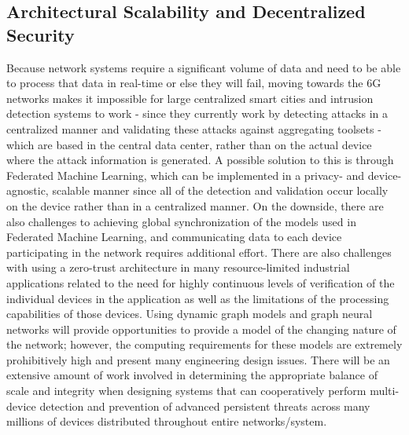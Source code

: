 \documentclass[12pt]{article}
\begin{document}
\subsection{Architectural Scalability and Decentralized Security}
Because network systems require a significant volume of data and need to be able to process that data in real-time or else they will fail, moving towards the 6G networks makes it impossible for large centralized smart cities and intrusion detection systems to work - since they currently work by detecting attacks in a centralized manner and validating these attacks against aggregating toolsets - which are based in the central data center, rather than on the actual device where the attack information is generated. A possible solution to this is through Federated Machine Learning, which can be implemented in a privacy- and device-agnostic, scalable manner since all of the detection and validation occur locally on the device rather than in a centralized manner. On the downside, there are also challenges to achieving global synchronization of the models used in Federated Machine Learning, and communicating data to each device participating in the network requires additional effort. There are also challenges with using a zero-trust architecture in many resource-limited industrial applications related to the need for highly continuous levels of verification of the individual devices in the application as well as the limitations of the processing capabilities of those devices. Using dynamic graph models and graph neural networks will provide opportunities to provide a model of the changing nature of the network; however, the computing requirements for these models are extremely prohibitively high and present many engineering design issues. There will be an extensive amount of work involved in determining the appropriate balance of scale and integrity when designing systems that can cooperatively perform multi-device detection and prevention of advanced persistent threats across many millions of devices distributed throughout entire networks/system.
\end{document}
